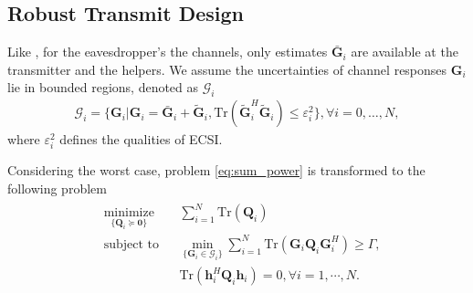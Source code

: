 \documentclass[journal]{IEEEtran}
\begin{document}
\subsection{Robust Transmit Design} \label{sec:robust programming}
Like \cite{huang_robust_2012}, for the eavesdropper's the channels, only estimates $\bar{\mathbf{G}}_{i}$ are available at the transmitter and the helpers. We assume the uncertainties of channel responses $\mathbf{G}_i$ lie in bounded regions, denoted as $\mathcal{G}_{i}$
\begin{eqnarray}
\mathcal{G}_{i} = \{\mathbf{G}_{i}|\mathbf{G}_{i} = \bar{\mathbf{G}}_{i} + \tilde{\mathbf{G}}_{i}, \text{Tr}\left(\tilde{\mathbf{G}}_{i}^H\tilde{\mathbf{G}}_{i}\right) \leq \varepsilon_i^2\},\forall i = 0,\ldots, N,
\end{eqnarray}
where $\varepsilon_i^2$ defines the qualities of ECSI. 

Considering the worst case, problem \eqref{eq:sum_power} is transformed to the following problem
\begin{eqnarray}
\begin{aligned} \label{eq:sum_power_robust}
	& \underset{\{\mathbf{Q}_i \succeq \mathbf{0}\}}{\text{minimize}}
	& & \sum_{i=1}^{N}\text{Tr}(\mathbf{Q}_i)\\
	& \text{subject to}
	& & \min_{\{\mathbf{G}_i \in \mathcal{G}_i\}}\sum_{i=1}^{N}\text{Tr}\left(\mathbf{G}_i\mathbf{Q}_i\mathbf{G}_i^H\right) \geq \Gamma  \label{eq:artificial noise constraint},\\
&&& \text{Tr}\left(\mathbf{h}_i^H\mathbf{Q}_i\mathbf{h}_i\right) = 0, \forall i = 1, \cdots, N.
\end{aligned}
\end{eqnarray}
\end{document}
